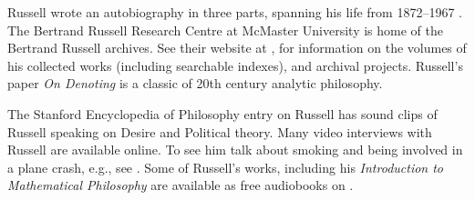 \documentclass[../../../include/open-logic-section]{subfiles}
\begin{document}
\begin{reading}
Russell wrote an autobiography in three parts, spanning his life from
1872--1967 \citep{Russell1967,Russell1968,Russell1969}.  The Bertrand
Russell Research Centre at McMaster University is home of the Bertrand
Russell archives. See their website at \citet{Duncan2015}, for
information on the volumes of his collected works (including
searchable indexes), and archival projects.  Russell's paper \emph{On
  Denoting} \citep{Russell1905} is a classic of 20th century analytic
philosophy.

The Stanford Encyclopedia of Philosophy entry on Russell
\citep{Irvine2015} has sound clips of Russell speaking on Desire and
Political theory. Many video interviews with Russell are available
online. To see him talk about smoking and being involved in a plane
crash, e.g., see \citet{RussellND}. Some of Russell's works, including
his \emph{Introduction to Mathematical Philosophy} are available as
free audiobooks on \citet{LibriVoxND}.
\end{reading}
\end{document}
